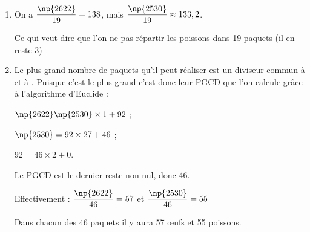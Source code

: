 
\medskip

%
%
%

\begin{enumerate}
\item %
On a $\dfrac{\np{2622}}{19} = 138$, mais $\dfrac{\np{2530}}{19} \approx  133,2$.

Ce qui veut dire que l'on ne pas répartir les  poissons dans 19 paquets (il en reste 3)
\item %
Le plus grand nombre de paquets qu'il peut réaliser est un diviseur commun à  et à . Puisque c'est le plus grand c'est donc leur PGCD que l'on calcule grâce à l'algorithme d'Euclide :

$\np{2622}  \np{2530} \times 1 + 92$ ;

$\np{2530} =  92 \times 27  + 46$ ;

$92 = 46 \times 2 + 0$.

Le PGCD est le dernier reste non nul, donc 46.

Effectivement : $\dfrac{\np{2622}}{46} = 57$ et   $\dfrac{\np{2530}}{46} = 55$

Dans chacun des 46 paquets il y aura 57 œufs et 55 poissons.
\end{enumerate}

\vspace{0.5cm}

